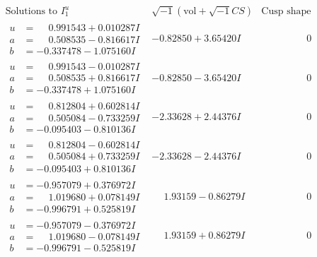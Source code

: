 \documentclass[1p]{elsarticle_modified}
\theoremstyle{definition}
\newcommand{\I}{\sqrt{-1}}
\begin{document}
$$\begin{array}{c|c|c}  
\text{Solutions to }I^u_{1}& \I (\text{vol} + \sqrt{-1}CS) & \text{Cusp shape}\\
 \hline 
\begin{aligned}
u &= \phantom{-}0.991543 + 0.010287 I \\
a &= \phantom{-}0.508535 - 0.816617 I \\
b &= -0.337478 - 1.075160 I\end{aligned}
 & -0.82850 + 3.65420 I & \phantom{-0.000000 } 0 \\ \hline\begin{aligned}
u &= \phantom{-}0.991543 - 0.010287 I \\
a &= \phantom{-}0.508535 + 0.816617 I \\
b &= -0.337478 + 1.075160 I\end{aligned}
 & -0.82850 - 3.65420 I & \phantom{-0.000000 } 0 \\ \hline\begin{aligned}
u &= \phantom{-}0.812804 + 0.602814 I \\
a &= \phantom{-}0.505084 - 0.733259 I \\
b &= -0.095403 - 0.810136 I\end{aligned}
 & -2.33628 + 2.44376 I & \phantom{-0.000000 } 0 \\ \hline\begin{aligned}
u &= \phantom{-}0.812804 - 0.602814 I \\
a &= \phantom{-}0.505084 + 0.733259 I \\
b &= -0.095403 + 0.810136 I\end{aligned}
 & -2.33628 - 2.44376 I & \phantom{-0.000000 } 0 \\ \hline\begin{aligned}
u &= -0.957079 + 0.376972 I \\
a &= \phantom{-}1.019680 + 0.078149 I \\
b &= -0.996791 + 0.525819 I\end{aligned}
 & \phantom{-}1.93159 - 0.86279 I & \phantom{-0.000000 } 0 \\ \hline\begin{aligned}
u &= -0.957079 - 0.376972 I \\
a &= \phantom{-}1.019680 - 0.078149 I \\
b &= -0.996791 - 0.525819 I\end{aligned}
 & \phantom{-}1.93159 + 0.86279 I & \phantom{-0.000000 } 0 \\ \hline\begin{aligned}

\end{aligned}
\end{array}$$
\end{document}
